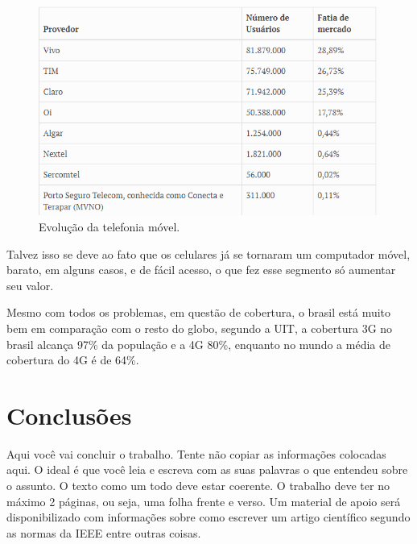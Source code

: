 \documentclass{sbrt2018port}
\begin{document}
\begin{figure}[!ht]%
    \centering
    \includegraphics[width=\linewidth]{fatiamercado.png}
    \caption{Evolução da telefonia móvel.}
    \label{f_cerd2}
\end{figure}

Talvez isso se deve ao fato que os celulares já se tornaram um computador móvel, barato, em alguns casos, e de fácil acesso, o que fez esse segmento só aumentar seu valor.

Mesmo com todos os problemas, em questão de cobertura, o brasil está muito bem em comparação com o resto do globo, segundo a UIT, a cobertura 3G no brasil alcança 97\% da população e a 4G 80\%, enquanto no mundo a média de cobertura do 4G é de 64\%.

\section{Conclusões}
\label{s_concl}

Aqui você vai concluir o trabalho. Tente não copiar as informações colocadas aqui. O ideal é que você leia e escreva com as suas palavras o que entendeu sobre o assunto. O texto como um todo deve estar coerente. O trabalho deve ter no máximo 2 páginas, ou seja, uma folha frente e verso. Um material de apoio será disponibilizado com informações sobre como escrever um artigo científico segundo as normas da IEEE entre outras coisas.
\end{document}
